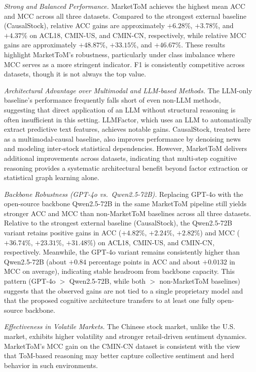 \documentclass[a4paper,fleqn,doubleblind]{cas-sc}
\begin{document}
\textit{Strong and Balanced Performance.} MarketToM achieves the highest mean ACC and MCC across all three datasets. Compared to the strongest external baseline (CausalStock), relative ACC gains are approximately $+6.28\%$, $+3.78\%$, and $+4.37\%$ on ACL18, CMIN-US, and CMIN-CN, respectively, while relative MCC gains are approximately $+48.87\%$, $+33.15\%$, and $+46.67\%$. These results highlight MarketToM's robustness, particularly under class imbalance where MCC serves as a more stringent indicator. F1 is consistently competitive across datasets, though it is not always the top value.

\textit{Architectural Advantage over Multimodal and LLM-based Methods.} The LLM-only baseline's performance frequently falls short of even non-LLM methods, suggesting that direct application of an LLM without structural reasoning is often insufficient in this setting. LLMFactor, which uses an LLM to automatically extract predictive text features, achieves notable gains. CausalStock, treated here as a multimodal-causal baseline, also improves performance by denoising news and modeling inter-stock statistical dependencies. However, MarketToM delivers additional improvements across datasets, indicating that multi-step cognitive reasoning provides a systematic architectural benefit beyond factor extraction or statistical graph learning alone.

\textit{Backbone Robustness (GPT-4o vs.\ Qwen2.5-72B).} Replacing GPT-4o with the open-source backbone Qwen2.5-72B in the same MarketToM pipeline still yields stronger ACC and MCC than non-MarketToM baselines across all three datasets. Relative to the strongest external baseline (CausalStock), the Qwen2.5-72B variant retains positive gains in ACC ($+4.82\%$, $+2.24\%$, $+2.82\%$) and MCC ($+36.74\%$, $+23.31\%$, $+31.48\%$) on ACL18, CMIN-US, and CMIN-CN, respectively. Meanwhile, the GPT-4o variant remains consistently higher than Qwen2.5-72B (about $+0.84$ percentage points in ACC and about $+0.0132$ in MCC on average), indicating stable headroom from backbone capacity. This pattern (GPT-4o $>$ Qwen2.5-72B, while both $>$ non-MarketToM baselines) suggests that the observed gains are not tied to a single proprietary model and that the proposed cognitive architecture transfers to at least one fully open-source backbone.

\textit{Effectiveness in Volatile Markets.} The Chinese stock market, unlike the U.S. market, exhibits higher volatility and stronger retail-driven sentiment dynamics. MarketToM’s MCC gain on the CMIN-CN dataset is consistent with the view that ToM-based reasoning may better capture collective sentiment and herd behavior in such environments.
\end{document}
